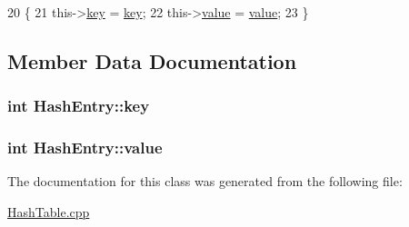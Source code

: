 \begin{DoxyCode}
20         \{
21             this->\hyperlink{classHashEntry_ae861ef0082b8111cb9e581d3961ab9b2}{key} = \hyperlink{classHashEntry_ae861ef0082b8111cb9e581d3961ab9b2}{key};
22             this->\hyperlink{classHashEntry_aa225f361520a57dbaf93e9d00bf69490}{value} = \hyperlink{classHashEntry_aa225f361520a57dbaf93e9d00bf69490}{value};
23         \}
\end{DoxyCode}


\subsection{Member Data Documentation}
\subsubsection[{\texorpdfstring{key}{key}}]{\setlength{\rightskip}{0pt plus 5cm}int Hash\+Entry\+::key}\hypertarget{classHashEntry_ae861ef0082b8111cb9e581d3961ab9b2}{}\label{classHashEntry_ae861ef0082b8111cb9e581d3961ab9b2}
\subsubsection[{\texorpdfstring{value}{value}}]{\setlength{\rightskip}{0pt plus 5cm}int Hash\+Entry\+::value}\hypertarget{classHashEntry_aa225f361520a57dbaf93e9d00bf69490}{}\label{classHashEntry_aa225f361520a57dbaf93e9d00bf69490}


The documentation for this class was generated from the following file\+:\begin{DoxyCompactItemize}
\item 
\hyperlink{HashTable_8cpp}{Hash\+Table.\+cpp}\end{DoxyCompactItemize}
